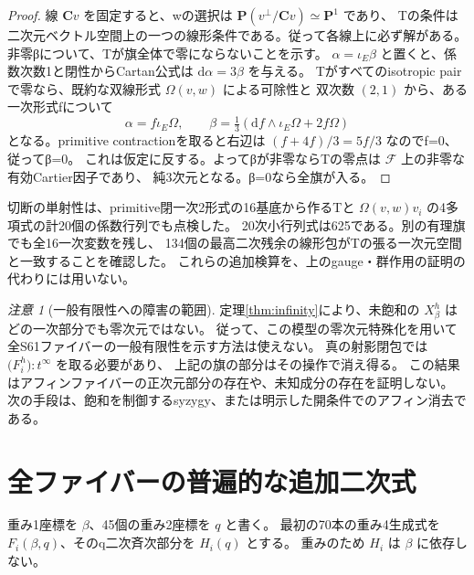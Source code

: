 \documentclass[11pt,a4paper]{ltjsarticle}
\newcommand{\CC}{\mathbf C}
\newcommand{\PP}{\mathbf P}
\newcommand{\dd}{\mathrm d}
\theoremstyle{remark}
\newtheorem{remark}[theorem]{注意}
\begin{document}
\begin{proof}
線 $\CC v$ を固定すると、wの選択は $\PP(v^\perp/\CC v)\simeq\PP^1$ であり、
Tの条件は二次元ベクトル空間上の一つの線形条件である。従って各線上に必ず解がある。
非零βについて、Tが旗全体で零にならないことを示す。
$\alpha=\iota_E\beta$ と置くと、係数次数1と閉性からCartan公式は $\dd\alpha=3\beta$ を与える。
Tがすべてのisotropic pairで零なら、既約な双線形式 $\Omega(v,w)$ による可除性と
双次数 $(2,1)$ から、ある一次形式fについて
\[
 \alpha=f\iota_E\Omega,\qquad
 \beta=\tfrac13(\dd f\wedge\iota_E\Omega+2f\Omega)
\]
となる。primitive contractionを取ると右辺は $(f+4f)/3=5f/3$ なのでf=0、従ってβ=0。
これは仮定に反する。よってβが非零ならTの零点は $\mathcal F$ 上の非零な有効Cartier因子であり、
純3次元となる。β=0なら全旗が入る。
\end{proof}

切断の単射性は、primitive閉一次2形式の16基底から作るTと
$\Omega(v,w)v_i$ の4多項式の計20個の係数行列でも点検した。
20次小行列式は625である。別の有理旗でも全16一次変数を残し、
134個の最高二次残余の線形包がTの張る一次元空間と一致することを確認した。
これらの追加検算を、上のgauge・群作用の証明の代わりには用いない。

\begin{remark}[一般有限性への障害の範囲]
定理\ref{thm:infinity}により、未飽和の $X_\beta^h$ はどの一次部分でも零次元ではない。
従って、この模型の零次元特殊化を用いて全S61ファイバーの一般有限性を示す方法は使えない。
真の射影閉包では $\bigl(F_i^h\bigr):t^\infty$ を取る必要があり、
上記の旗の部分はその操作で消え得る。
この結果はアフィンファイバーの正次元部分の存在や、未知成分の存在を証明しない。
次の手段は、飽和を制御するsyzygy、または明示した開条件でのアフィン消去である。
\end{remark}

\section{全ファイバーの普遍的な追加二次式}\label{sec:universal-weight6}
重み1座標を $\beta$、45個の重み2座標を $q$ と書く。
最初の70本の重み4生成式を $F_i(\beta,q)$、そのq二次斉次部分を $H_i(q)$ とする。
重みのため $H_i$ は $\beta$ に依存しない。
\end{document}

